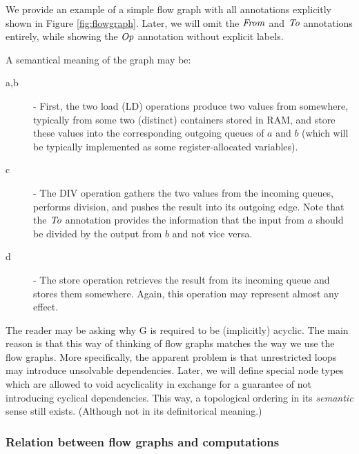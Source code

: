     We provide an example of a simple flow graph with all annotations explicitly shown in Figure \ref{fig:flowgraph}. Later, we will omit the $\mf{from}$ and $\mf{to}$ annotations entirely, while showing the $\mf{op}$ annotation without explicit labels. 

A semantical meaning of the graph may be:


  \begin{description}
  \item[a,b] - First, the two load (LD) operations produce two values from somewhere, typically from some two (distinct) containers stored in RAM, and store these values into the corresponding outgoing queues of $a$ and $b$ (which will be typically implemented as some register-allocated variables). 
  \item[c] - The DIV operation gathers the two values from the incoming queues, performs division, and pushes the result into its outgoing edge. Note that the $\mf{to}$ annotation provides the information that the input from $a$ should be divided by the output from $b$ and not vice versa.
  \item[d] - The store operation retrieves the result from its incoming queue and stores them somewhere. Again, this operation may represent almost any effect.
  \end{description}

    \FloatBarrier

\begin{rem}
  The reader may be asking why G is required to be (implicitly) acyclic. The main reason is that this way of thinking of flow graphs matches the way we use the flow graphs. More specifically, the apparent problem is that unrestricted loops may introduce unsolvable dependencies. Later, we will define special node types which are allowed to void acyclicality in exchange for a guarantee of not introducing cyclical dependencies. This way, a topological ordering in its \emph{semantic} sense still exists. (Although not in its definitorical meaning.) 
\end{rem}

\subsubsection{Relation between flow graphs and computations}


